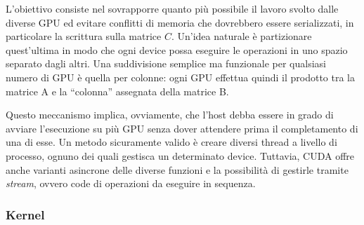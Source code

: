 \documentclass[a4paper]{article}
\begin{document}
L'obiettivo consiste nel sovrapporre quanto più possibile il lavoro svolto dalle diverse GPU ed evitare conflitti di memoria che dovrebbero essere serializzati, in particolare la scrittura sulla matrice $C$. Un'idea naturale è partizionare quest'ultima in modo che ogni device possa eseguire le operazioni in uno spazio separato dagli altri.
Una suddivisione semplice ma funzionale per qualsiasi numero di GPU è quella per colonne: ogni GPU effettua quindi il prodotto tra la matrice A e la ``colonna'' assegnata della matrice B.




Questo meccanismo implica, ovviamente, che l'host debba essere in grado di avviare l'esecuzione su più GPU senza dover attendere prima il completamento di una di esse.
Un metodo sicuramente valido è creare diversi thread a livello di processo, ognuno dei quali gestisca un determinato device.
Tuttavia, CUDA offre anche varianti asincrone delle diverse funzioni e la possibilità di gestirle tramite \textit{stream}, ovvero code di operazioni da eseguire in sequenza.


\subsubsection{Kernel}
\end{document}
